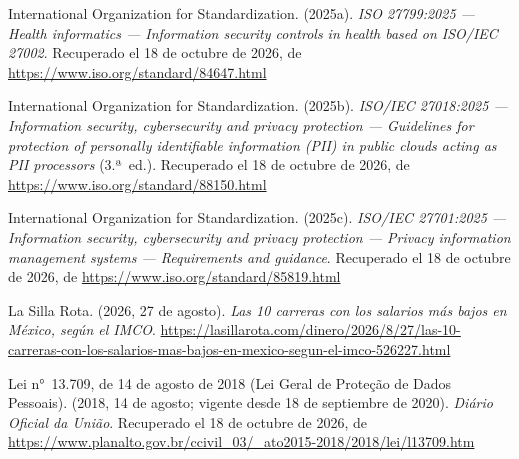 \documentclass[12pt, a4paper]{article}
\begin{document}
\begin{list}{}{\setlength{\leftmargin}{1.27cm}\setlength{\itemindent}{-1.27cm}%
  \setlength{\labelwidth}{0pt}\setlength{\labelsep}{0pt}\setlength{\itemsep}{6pt}}
\item International Organization for Standardization. (2025a).
  \textit{ISO 27799:2025 --- Health informatics --- Information
  security controls in health based on ISO/IEC 27002}.
  Recuperado el 18 de octubre de 2026, de \url{https://www.iso.org/standard/84647.html}
 
 
\item International Organization for Standardization. (2025b).
  \textit{ISO/IEC 27018:2025 --- Information security, cybersecurity
  and privacy protection --- Guidelines for protection of personally
  identifiable information (PII) in public clouds acting as PII
  processors} (3.ª~ed.).
  Recuperado el 18 de octubre de 2026, de \url{https://www.iso.org/standard/88150.html}
 

\item International Organization for Standardization. (2025c).
  \textit{ISO/IEC 27701:2025 --- Information security, cybersecurity
  and privacy protection --- Privacy information management
  systems --- Requirements and guidance}.
  Recuperado el 18 de octubre de 2026, de \url{https://www.iso.org/standard/85819.html}
 

\item La Silla Rota. (2026, 27 de agosto). \textit{Las 10 carreras con los
  salarios más bajos en México, según el IMCO}. \url{https://lasillarota.com/dinero/2026/8/27/las-10-carreras-con-los-salarios-mas-bajos-en-mexico-segun-el-imco-526227.html}
 

\item Lei n°~13.709, de 14 de agosto de 2018 (Lei Geral de
  Proteção de Dados Pessoais). (2018, 14 de agosto; vigente desde
  18 de septiembre de 2020). \textit{Diário Oficial da União}. Recuperado el 18 de octubre de 2026, de \url{https://www.planalto.gov.br/ccivil_03/_ato2015-2018/2018/lei/l13709.htm}


\end{list}
\end{document}
